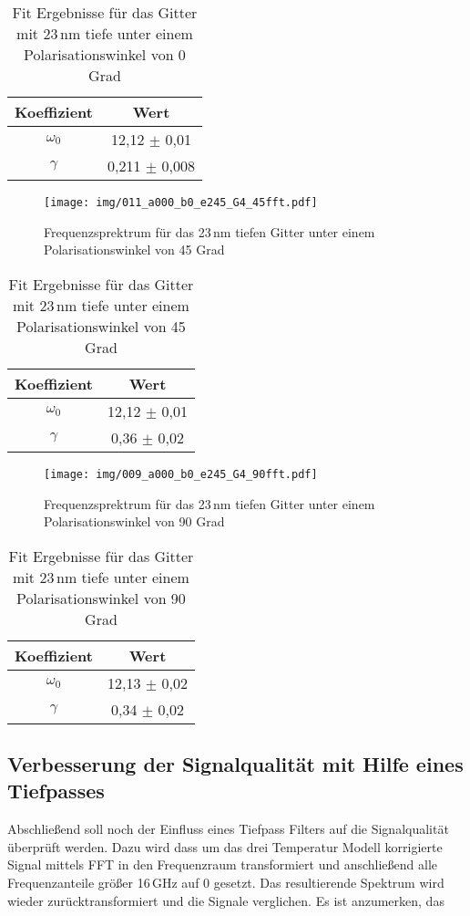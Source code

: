 \begin{table}[!htbp]
 \centering
\begin{tabular}{cc}
    Koeffizient & Wert \\
	\midrule
 	$\omega_0$ & 12,12 $\pm$ 0,01 \\
 	$\gamma$ & 0,211 $\pm$ 0,008 \\
\end{tabular}
\caption{Fit Ergebnisse für das Gitter mit 23\,nm tiefe unter einem Polarisationswinkel von 0 Grad}
\label{tab:fit}
\end{table}

\begin{figure}[!htbp]
 	\centering
 	\texttt{[image: img/011\_a000\_b0\_e245\_G4\_45fft.pdf]}
 	\caption{Frequenzsprektrum für das 23\,nm tiefen Gitter unter einem Polarisationswinkel von 45 Grad}
 	\label{abb:film}
\end{figure}

\begin{table}[!htbp]
 \centering
\begin{tabular}{cc}
    Koeffizient & Wert \\
	\midrule
 	$\omega_0$ & 12,12 $\pm$ 0,01 \\
 	$\gamma$ & 0,36 $\pm$ 0,02 \\
\end{tabular}
\caption{Fit Ergebnisse für das Gitter mit 23\,nm tiefe unter einem Polarisationswinkel von 45 Grad}
\label{tab:fit}
\end{table}

\begin{figure}[!htbp]
 	\centering
 	\texttt{[image: img/009\_a000\_b0\_e245\_G4\_90fft.pdf]}
 	\caption{Frequenzsprektrum für das 23\,nm tiefen Gitter unter einem Polarisationswinkel von 90 Grad}
 	\label{abb:film}
\end{figure}

\begin{table}[!htbp]
 \centering
\begin{tabular}{cc}
    Koeffizient & Wert \\
	\midrule
 	$\omega_0$ & 12,13 $\pm$ 0,02 \\
 	$\gamma$ & 0,34 $\pm$ 0,02 \\
\end{tabular}
\caption{Fit Ergebnisse für das Gitter mit 23\,nm tiefe unter einem Polarisationswinkel von 90 Grad}
\label{tab:fit}
\end{table}

\newpage
\subsection{Verbesserung der Signalqualität mit Hilfe eines Tiefpasses}
\noindent Abschließend soll noch der Einfluss eines Tiefpass Filters auf die Signalqualität überprüft werden. Dazu wird dass um das drei Temperatur Modell korrigierte Signal mittels FFT in den Frequenzraum transformiert und anschließend alle Frequenzanteile größer 16$\,$GHz auf 0 gesetzt.
Das resultierende Spektrum wird wieder zurücktransformiert und die Signale verglichen. Es ist anzumerken, das  

